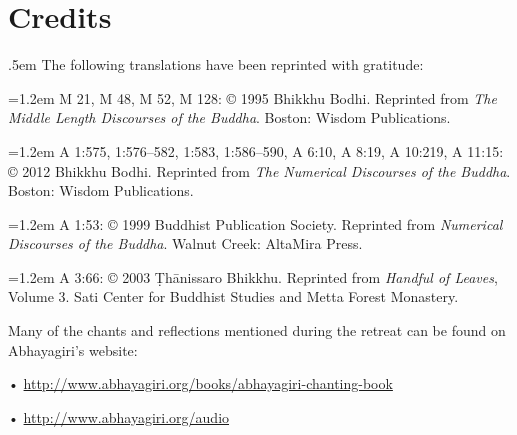 \chapter{Credits}\label{credits}
{\parindent 0pt\parskip .5em
The following translations have been reprinted with gratitude:

\vspace{1em}
\hangindent=1.2em M 21, M 48, M 52, M 128: © 1995 Bhikkhu Bodhi.
Reprinted from \emph{The Middle Length Discourses of the Buddha}.
Boston: Wisdom Publications.

\hangindent=1.2em A 1:575, 1:576–582, 1:583, 1:586–590, A 6:10, A 8:19,
A 10:219, A 11:15: © 2012 Bhikkhu Bodhi. Reprinted from \emph{The
Numerical Discourses of the Buddha}. Boston: Wisdom Publications.

\hangindent=1.2em A 1:53: © 1999 Buddhist Publication Society. Reprinted
from \emph{Numerical Discourses of the Buddha}. Walnut Creek: AltaMira
Press.

\hangindent=1.2em A 3:66: © 2003 Ṭhānissaro Bhikkhu. Reprinted from
\emph{Handful of Leaves}, Volume 3. Sati Center for Buddhist Studies
and Metta Forest Monastery.


\vspace{1.5em}
Many of the chants and reflections mentioned during the retreat can be
found on Abhayagiri's website:

•\hspace{.5em}
\href{http://www.abhayagiri.org/books/abhayagiri-chanting-book}
{http://www.abhayagiri.org/books/abhayagiri-chanting-book}

•\hspace{.5em} \href{http://www.abhayagiri.org/audio}
{http://www.abhayagiri.org/audio}

}

